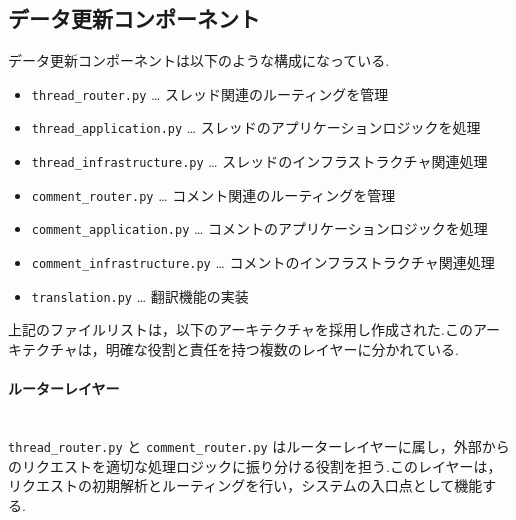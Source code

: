 \documentclass[b5paper,12pt,dvipdfmx]{jsreport}
\newcommand{\red}[1]{\textcolor{red}{#1}}
\begin{document}



\subsection*{データ更新コンポーネント}

データ更新コンポーネントは以下のような構成になっている.

\begin{itemize}
    \item \texttt{thread\_router.py} … スレッド関連のルーティングを管理
    \item \texttt{thread\_application.py} … スレッドのアプリケーションロジックを処理
    \item \texttt{thread\_infrastructure.py} … スレッドのインフラストラクチャ関連処理
    \item \texttt{comment\_router.py} … コメント関連のルーティングを管理
    \item \texttt{comment\_application.py} … コメントのアプリケーションロジックを処理
    \item \texttt{comment\_infrastructure.py} … コメントのインフラストラクチャ関連処理
    \item \texttt{translation.py} … 翻訳機能の実装
\end{itemize}


上記のファイルリストは，以下のアーキテクチャを採用し作成された.このアーキテクチャは，明確な役割と責任を持つ複数のレイヤーに分かれている.

\paragraph{ルーターレイヤー}\mbox{}\\
\texttt{thread\_router.py} と \texttt{comment\_router.py} はルーターレイヤーに属し，外部からのリクエストを適切な処理ロジックに振り分ける役割を担う.このレイヤーは，リクエストの初期解析とルーティングを行い，システムの入口点として機能する.
\end{document}
